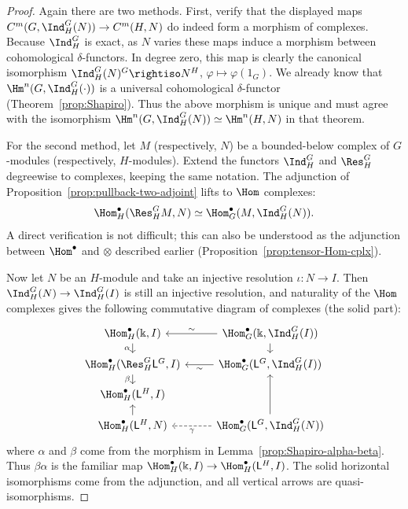 \begin{proof}
	Again there are two methods. First, verify that the displayed maps
	$C^m(G,\Ind^G_H(N))\to C^m(H,N)$ do indeed form a morphism of complexes.
	Because $\Ind^G_H$ is exact, as $N$ varies these maps induce a morphism
	between cohomological $\delta$-functors. In degree zero, this map is
	clearly the canonical isomorphism
	$\Ind^G_H(N)^G\rightiso N^H$, $\varphi\mapsto\varphi(1_G)$. We already
	know that $\Hm^n(G,\Ind^G_H(\cdot))$ is a universal cohomological
	$\delta$-functor (Theorem~\ref{prop:Shapiro}). Thus the above morphism is
	unique and must agree with the isomorphism
	$\Hm^n(G,\Ind^G_H(N))\simeq\Hm^n(H,N)$ in that theorem.

	For the second method, let $M$ (respectively, $N$) be a bounded-below
	complex of $G$-modules (respectively, $H$-modules). Extend the functors
	$\Ind^G_H$ and $\Res^G_H$ degreewise to complexes, keeping the same
	notation. The adjunction of Proposition~\ref{prop:pullback-two-adjoint}
	lifts to $\Hom$ complexes:
	\[ \Hom^\bullet_H(\Res^G_HM,N)
	\simeq\Hom^\bullet_G(M,\Ind^G_H(N)). \]
	A direct verification is not difficult; this can also be understood as
	the adjunction between $\Hom^\bullet$ and $\otimes$ described earlier
	(Proposition~\ref{prop:tensor-Hom-cplx}).

	Now let $N$ be an $H$-module and take an injective resolution
	$\iota:N\to I$. Then $\Ind^G_H(N)\to\Ind^G_H(I)$ is still an injective
	resolution, and naturality of the $\Hom$ complexes gives the following
	commutative diagram of complexes (the solid part):
	\begin{equation}\label{eqn:Shapiro-explicit-diagram}
	\begin{tikzcd}[row sep=small]
		\Hom^\bullet_H(\Bbbk,I) \arrow[d,"\alpha"'] &
		\Hom^\bullet_G(\Bbbk,\Ind^G_H(I)) \arrow[l,"\sim"'] \arrow[d] \\
		\Hom^\bullet_H(\Res^G_H\mathsf{L}^G,I) \arrow[d,"\beta"'] &
		\Hom^\bullet_G(\mathsf{L}^G,\Ind^G_H(I)) \arrow[l,"\sim"] \\
		\Hom^\bullet_H(\mathsf{L}^H,I) & \\
		\Hom^\bullet_H(\mathsf{L}^H,N) \arrow[u] &
		\Hom^\bullet_G(\mathsf{L}^G,\Ind^G_H(N))
		\arrow[uu] \arrow[dashed,l,"\gamma"]
	\end{tikzcd}
	\end{equation}
	where $\alpha$ and $\beta$ come from the morphism in
	Lemma~\ref{prop:Shapiro-alpha-beta}. Thus $\beta\alpha$ is the familiar
	map $\Hom^\bullet_H(\Bbbk,I)\to\Hom^\bullet_H(\mathsf{L}^H,I)$. The
	solid horizontal isomorphisms come from the adjunction, and all vertical
	arrows are quasi-isomorphisms.


\end{proof}
